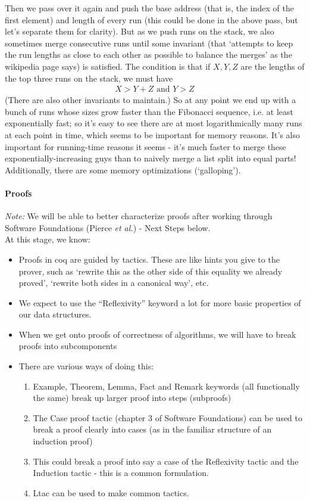 \documentclass{article}
\begin{document}
\begin{itemize}
\begin{itemize}
    Then we pass over it again and push the base address (that is, the index of
    the first element) and length of every run (this could be done in the above
    pass, but let's separate them for clarity).
    But as we push runs on the stack,
    we also sometimes merge consecutive runs until some invariant
    (that `attempts
    to keep the run lengths as close to each other as possible to balance the
    merges' as the wikipedia page says) is satisfied.
    The condition is that if
    $X,Y,Z$ are the lengths of the top three runs on the stack, we must have
	  \begin{align*}
	  X > Y + Z \text{ and } Y >Z
    \end{align*}
    (There are also other invariants to maintain.)
	  So at any point we end up with a bunch of runs whose sizes grow
    faster than the Fibonacci sequence, i.e. at least exponentially fast; so
    it's easy to see there are at most logarithmically
    many runs at each point in
    time, which seems to be important for memory reasons.
    It's also important for
    running-time reasons it seems - it's much faster to merge these
    exponentially-increasing guys than to naively merge a list split into
    equal parts!
	  Additionally, there are some memory optimizations (`galloping').
\end{itemize}

\paragraph{Proofs}  %
\emph{Note:} We will be able to better characterize proofs after
working through Software Foundations (Pierce \emph{et al.}) - Next
Steps below.\\
At this stage, we know:
\begin{itemize}
\item Proofs in coq are guided by tactics. These are like hints you
  give to the prover, such as ‘rewrite this as the other side of this
  equality we already proved’, ‘rewrite both sides in a canonical
  way’,  etc.
\item We expect to use the ``Reflexivity'' keyword a lot for more
  basic properties of our data structures.
\item When we get onto proofs of correctness of algorithms, we will
  have to break proofs into subcomponents
\item There are various ways of doing this:
\begin{enumerate}
\item Example, Theorem, Lemma, Fact and Remark keywords (all
  functionally the same) break up larger proof into steps (subproofs)
\item The Case proof tactic (chapter 3 of Software Foundations) can be
  used to break a proof clearly into cases (as in the familiar
  structure of an induction proof)
\item This could break a proof into say a case of the Reflexivity
  tactic and the Induction tactic - this is a common formulation.
\item Ltac can be used to make common tactics.
\end{enumerate}


\end{itemize}
\end{itemize}
\end{document}

